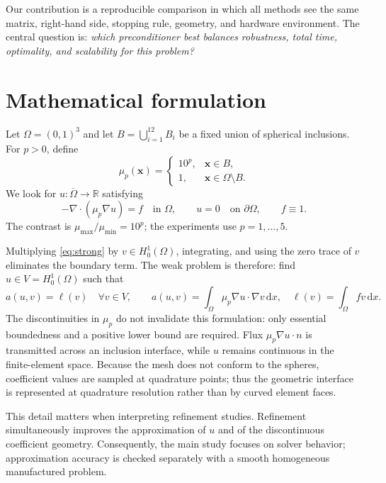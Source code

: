 \documentclass[10pt,a4paper]{article}
\begin{document}
Our contribution is a reproducible comparison in which all methods see the same matrix, right-hand
side, stopping rule, geometry, and hardware environment. The central question is: \emph{which
preconditioner best balances robustness, total time, optimality, and scalability for this problem?}

\newpage
\section{Mathematical formulation}
Let $\Omega=(0,1)^3$ and let $B=\bigcup_{i=1}^{12}B_i$ be a fixed union of spherical inclusions.
For $p>0$, define
\begin{equation}
 \mu_p(\boldsymbol{x})=
 \begin{cases}10^p,&\boldsymbol{x}\in B,\\1,&\boldsymbol{x}\in\Omega\setminus B.
 \end{cases}
 \label{eq:mu}
\end{equation}
We look for $u:\overline\Omega\rightarrow\mathbb{R}$ satisfying
\begin{equation}
 -\nabla\!\cdot(\mu_p\nabla u)=f\quad\text{in }\Omega,
 \qquad u=0\quad\text{on }\partial\Omega, \qquad f\equiv1.
 \label{eq:strong}
\end{equation}
The contrast is $\mu_{\max}/\mu_{\min}=10^p$; the experiments use $p=1,\ldots,5$.

Multiplying \cref{eq:strong} by $v\in H_0^1(\Omega)$, integrating, and using the zero trace of
$v$ eliminates the boundary term. The weak problem is therefore: find $u\in V=H_0^1(\Omega)$
such that
\begin{equation}
 a(u,v)=\ell(v)\quad\forall v\in V,
 \qquad
 a(u,v)=\int_\Omega\mu_p\nabla u\cdot\nabla v\,\mathrm dx,
 \quad \ell(v)=\int_\Omega fv\,\mathrm dx.
 \label{eq:weak}
\end{equation}
The discontinuities in $\mu_p$ do not invalidate this formulation: only essential boundedness
and a positive lower bound are required. Flux $\mu_p\nabla u\cdot n$ is transmitted across an
inclusion interface, while $u$ remains continuous in the finite-element space. Because the mesh
does not conform to the spheres, coefficient values are sampled at quadrature points; thus the
geometric interface is represented at quadrature resolution rather than by curved element faces.

This detail matters when interpreting refinement studies. Refinement simultaneously improves the
approximation of $u$ and of the discontinuous coefficient geometry. Consequently, the main study
focuses on solver behavior; approximation accuracy is checked separately with a smooth homogeneous
manufactured problem.
\end{document}
